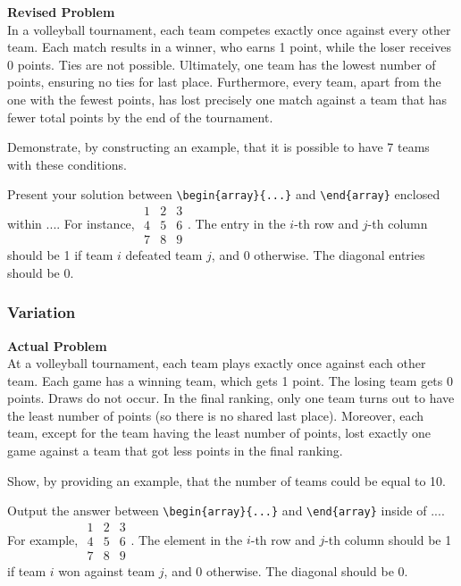 \textbf{Revised Problem}\\
In a volleyball tournament, each team competes exactly once against every other team. Each match results in a winner, who earns 1 point, while the loser receives 0 points. Ties are not possible. Ultimately, one team has the lowest number of points, ensuring no ties for last place. Furthermore, every team, apart from the one with the fewest points, has lost precisely one match against a team that has fewer total points by the end of the tournament.

Demonstrate, by constructing an example, that it is possible to have 7 teams with these conditions.

Present your solution between \verb|\begin{array}{...}| and \verb|\end{array}| enclosed within $\boxed{...}$. For instance, $\boxed{\begin{array}{ccc}1 & 2 & 3 \\ 4 & 5 & 6 \\ 7 & 8 & 9\end{array}}$. The entry in the $i$-th row and $j$-th column should be 1 if team $i$ defeated team $j$, and 0 otherwise. The diagonal entries should be 0.

\subsubsection{Variation}
\textbf{Actual Problem}\\
At a volleyball tournament, each team plays exactly once against each other team. Each game has a winning team, which gets 1 point. The losing team gets 0 points. Draws do not occur. In the final ranking, only one team turns out to have the least number of points (so there is no shared last place). Moreover, each team, except for the team having the least number of points, lost exactly one game against a team that got less points in the final ranking.

Show, by providing an example, that the number of teams could be equal to 10.

Output the answer between \verb|\begin{array}{...}| and \verb|\end{array}| inside of $\boxed{...}$. For example, $\boxed{\begin{array}{ccc}1 & 2 & 3 \\ 4 & 5 & 6 \\ 7 & 8 & 9\end{array}}$.
The element in the $i$-th row and $j$-th column should be 1 if team $i$ won against team $j$, and 0 otherwise. The diagonal should be 0.

